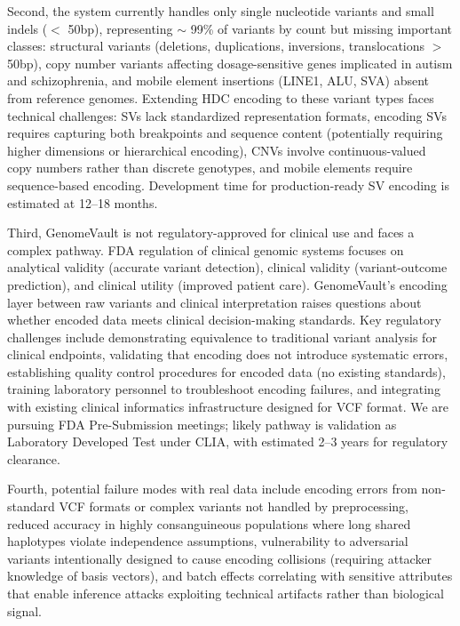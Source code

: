 \documentclass[11pt,letterpaper]{article}
\begin{document}
Second, the system currently handles only single nucleotide variants and small indels ($<$ 50bp), representing $\sim$ 99\% of variants by count but missing important classes: structural variants (deletions, duplications, inversions, translocations $>$ 50bp), copy number variants affecting dosage-sensitive genes implicated in autism and schizophrenia, and mobile element insertions (LINE1, ALU, SVA) absent from reference genomes. Extending HDC encoding to these variant types faces technical challenges: SVs lack standardized representation formats, encoding SVs requires capturing both breakpoints and sequence content (potentially requiring higher dimensions or hierarchical encoding), CNVs involve continuous-valued copy numbers rather than discrete genotypes, and mobile elements require sequence-based encoding. Development time for production-ready SV encoding is estimated at 12--18 months.

Third, GenomeVault is not regulatory-approved for clinical use and faces a complex pathway. FDA regulation of clinical genomic systems focuses on analytical validity (accurate variant detection), clinical validity (variant-outcome prediction), and clinical utility (improved patient care). GenomeVault's encoding layer between raw variants and clinical interpretation raises questions about whether encoded data meets clinical decision-making standards. Key regulatory challenges include demonstrating equivalence to traditional variant analysis for clinical endpoints, validating that encoding does not introduce systematic errors, establishing quality control procedures for encoded data (no existing standards), training laboratory personnel to troubleshoot encoding failures, and integrating with existing clinical informatics infrastructure designed for VCF format. We are pursuing FDA Pre-Submission meetings; likely pathway is validation as Laboratory Developed Test under CLIA, with estimated 2--3 years for regulatory clearance.

Fourth, potential failure modes with real data include encoding errors from non-standard VCF formats or complex variants not handled by preprocessing, reduced accuracy in highly consanguineous populations where long shared haplotypes violate independence assumptions, vulnerability to adversarial variants intentionally designed to cause encoding collisions (requiring attacker knowledge of basis vectors), and batch effects correlating with sensitive attributes that enable inference attacks exploiting technical artifacts rather than biological signal.
\end{document}

